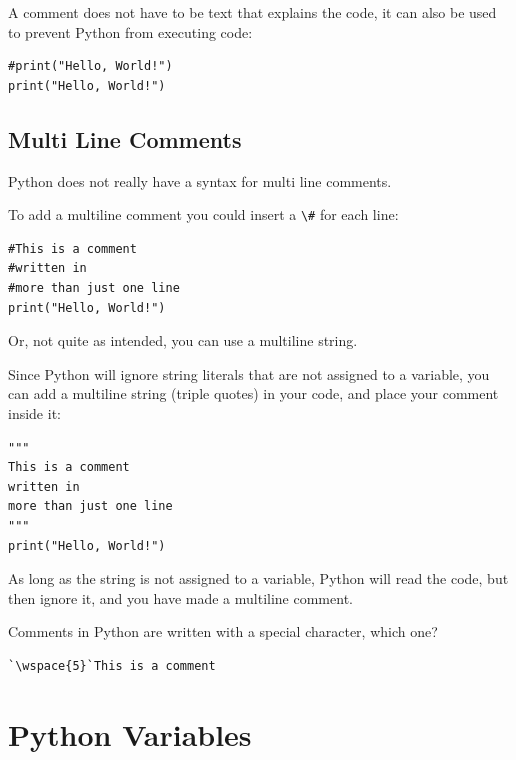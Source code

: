 \documentclass[12pt,a4paper]{article}
\newcommand{\wspace}[1]{%
	\color{white}\colorbox{white}{\texttt{#1}}%
}
\newcommand{\code}[1]{%
	\colorbox{backcolour}{\lstinline{#1}}%
}
\begin{document}
A comment does not have to be text that explains the code, it can also be used
to prevent Python from executing code:

\begin{ebox}
	\begin{lstlisting}
#print("Hello, World!")
print("Hello, World!")
	\end{lstlisting}
\end{ebox}
\subsection{Multi Line Comments}
Python does not really have a syntax for multi line comments.

To add a multiline comment you could insert a \code{\#} for each line:

\begin{ebox}
	\begin{lstlisting}
#This is a comment
#written in
#more than just one line
print("Hello, World!")
	\end{lstlisting}
\end{ebox}

Or, not quite as intended, you can use a multiline string.

Since Python will ignore string literals that are not assigned to a variable,
you can add a multiline string (triple quotes) in your code, and place your
comment inside it:

\begin{ebox}
	\begin{lstlisting}
"""
This is a comment
written in
more than just one line
"""
print("Hello, World!")
	\end{lstlisting}
\end{ebox}

As long as the string is not assigned to a variable, Python will read the code,
but then ignore it, and you have made a multiline comment.

\begin{tbox}
Comments in Python are written with a special character, which one?

	\begin{lstlisting}[numbers=none]
`\wspace{5}`This is a comment
	\end{lstlisting}
\end{tbox}
\vfill\newpage
\section{Python Variables}\label{pyVariables}
\end{document}
